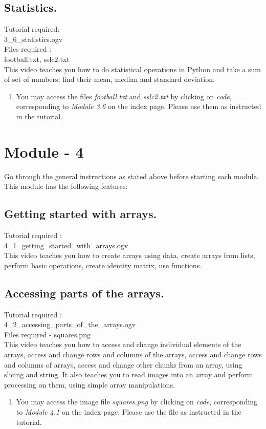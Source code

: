 \documentclass[11pt,twocolumn]{article}
\newenvironment{enumcpt}{\begin{enumerate} \topsep 0pt \partopsep 0pt 
                        \parsep 0pt
                        \itemsep 0pt \leftmargin -1in \rightmargin 0pt
                        }{\end{enumerate}}
\begin{document}
\subsection{Statistics.}
Tutorial required: \\ 3\_6\_statistics.ogv \\
Files required :\\ football.txt, sslc2.txt \\
This video teaches you how to do statistical operations in Python and take a sum of set of numbers; find their mean, median and standard deviation. \\
\begin{enumcpt}
\item You may access the files \emph{football.txt} and \emph{sslc2.txt} by clicking on \emph{code}, corresponding to \emph{Module 3.6} on the index page. Please use them as instructed in the tutorial. 
\end{enumcpt}


\section{Module - 4}
Go through the general instructions as stated above before starting each module.\\
This module has the following features:
\subsection{Getting started with arrays.}
Tutorial required : \\ 4\_1\_getting\_started\_with\_arrays.ogv \\
This video teaches you how to create arrays using data, create arrays from lists, perform basic operations, create identity matrix, use functions.
\subsection{Accessing parts of the arrays.}

Tutorial required : \\ 4\_2\_accessing\_parts\_of\_the\_arrays.ogv \\
Files required - squares.png\\
This video teaches you how to access and change individual elements of the arrays, access and change rows and columns of the arrays, access and change rows and columns of arrays, access and change other chunks from an array, using slicing and string. It also teaches you to read images into an array and perform processing on them, using simple array manipulations.
\begin{enumcpt}
\item You may access the image file \emph{squares.png} by clicking on \emph{code}, corresponding to \emph{Module 4.1} on the index page. Please use the file as instructed in the tutorial. 
\end{enumcpt}
 
\end{document}
